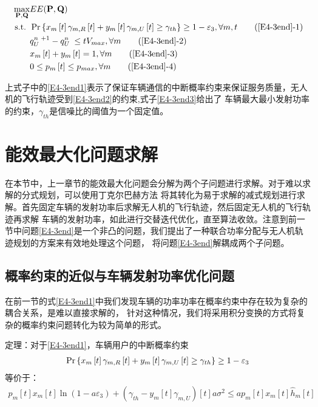 \begin{align}
\max _{ \mathbf{P}, \mathbf{Q}} & EE(\mathbf{P}, \mathbf{Q})                                          \label{E4-3end}\\
\text { s.t. }
& \Pr\left\{x_m\left[t\right]\gamma_{m,R}\left[t\right]+
y_m\left[t\right]\gamma_{m,U}\left[t\right]\geq \gamma_{th}\right\}\geq1-
\varepsilon_3, \forall m,t                                               \tag{\ref{E4-3end}{-1}}      \label{E4-3end1}\\  %
& q_U^{n\mathrm{\ }+1}-q_U^{n\mathrm{\ }}\le tV_{max}, \forall m         \tag{\ref{E4-3end}{-2}}      \label{E4-3end2}\\  %
& x_m\left[t\right] + y_m\left[t\right]=1, \forall m                     \tag{\ref{E4-3end}{-3}}      \label{E4-3end3}\\  %
& 0\le p_m\left[t\right]\le p_{max}, \forall m                           \tag{\ref{E4-3end}{-4}}      \label{E4-3end4}    %
\end{align}

上式子中的\eqref{E4-3end1}表示了保证车辆通信的中断概率约束来保证服务质量，无人机的飞行轨迹受到\eqref{E4-3end2}的约束,式子\eqref{E4-3end3}给出了
车辆最大最小发射功率的约束，$\gamma_{th}$是信噪比的阈值为一个固定值。


\section{能效最大化问题求解}\label{section4-3}
在本节中，上一章节的能效最大化问题会分解为两个子问题进行求解。对于难以求解的分式规划，可以使用丁克尔巴赫方法
将其转化为易于求解的减式规划进行求解。首先固定车辆的发射功率后求解无人机的飞行轨迹，然后固定无人机的飞行轨迹再求解
车辆的发射功率，如此进行交替迭代优化，直至算法收敛。注意到前一节中问题\eqref{E4-3end}是一个非凸的问题，我们提出了一种联合功率分配与无人机轨迹规划的方案来有效地处理这个问题，
将问题\eqref{E4-3end}解耦成两个子问题。
\subsection{概率约束的近似与车辆发射功率优化问题}\label{section4-3-1}
在前一节的式\eqref{E4-3end1}中我们发现车辆的功率功率在概率约束中存在较为复杂的耦合关系，是难以直接求解的，
针对这种情况，我们将采用积分变换的方式将复杂的概率约束问题转化为较为简单的形式。

定理：对于\eqref{E4-3end1}，车辆用户的中断概率约束
\begin{align}
\Pr\left\{x_m\left[t\right]\gamma_{m,R}\left[t\right]+y_m\left[t\right]\gamma_{m,U}\left[t\right] \geq \gamma_{th}\right\}\geq1-\varepsilon_3    \notag
\end{align}
等价于：
\begin{equation} \label{E4-13}
\begin{gathered}
p_m\left[t\right]x_m\left[t\right]\ln \left(1-a \varepsilon_3\right)+(\gamma_{th}-y_m\left[t\right]\gamma_{m,U})\left[t\right] a \sigma^2
\leq a p_m\left[t\right]x_m\left[t\right]\hat{h}_{m}\left[t\right]
\end{gathered}
\end{equation}

